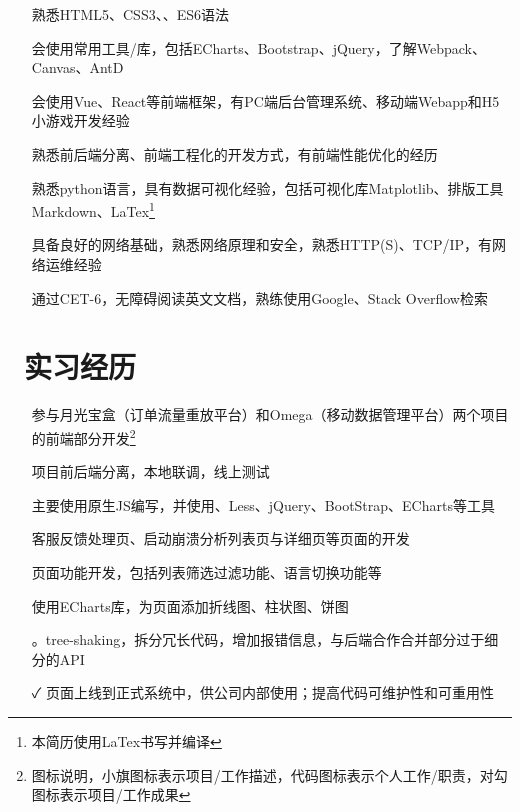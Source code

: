 \documentclass[14pt]{resume}
\begin{document}
\begin{itemize}
    \item[\faTree] 熟悉HTML5、CSS3、\textbf{\color{red}{原生JavaScript}}、ES6语法
    \item[\faTree] 会使用常用工具/库，包括ECharts、Bootstrap、jQuery，了解Webpack、Canvas、AntD
    \item[\faTree] 会使用Vue、React等前端框架，有PC端后台管理系统、移动端Webapp和H5小游戏开发经验
    \item[\faTree] 熟悉前后端分离、前端工程化的开发方式，有前端性能优化的经历
    \item[\faTree] 熟悉python语言，具有数据可视化经验，包括可视化库Matplotlib、排版工具Markdown、LaTex\footnote{本简历使用LaTex书写并编译}
    \item[\faTree] 具备良好的网络基础，熟悉网络原理和安全，熟悉HTTP(S)、TCP/IP，有网络运维经验
    \item[\faTree] 通过CET-6，无障碍阅读英文文档，熟练使用Google、Stack Overflow检索
\end{itemize}

\section{\faBriefcase\ 实习经历}
\begin{itemize}
    \item[\faFlagO] 参与月光宝盒（订单流量重放平台）和Omega（移动数据管理平台）两个项目的前端部分开发\footnote{图标说明，小旗图标表示项目/工作描述，代码图标表示个人工作/职责，对勾图标表示项目/工作成果}
    \item[\faFlagO] 项目前后端分离，本地联调，线上测试
    \item[\faFlagO] 主要使用原生JS编写，并使用\textbf{\color{red}{模板引擎Simplite}}、Less、jQuery、BootStrap、ECharts等工具
    \item[\faCode] 客服反馈处理页、启动崩溃分析列表页与详细页等页面的开发
    \item[\faCode] 页面功能开发，包括列表筛选过滤功能、语言切换功能等
    \item[\faCode] 使用ECharts库，为页面添加折线图、柱状图、饼图
    \item[\faCode] \textbf{\color{red}{代码重构}}。tree-shaking，拆分冗长代码，增加报错信息，与后端合作合并部分过于细分的API
    \item[\faCheck] 页面上线到正式系统中，供公司内部使用；提高代码可维护性和可重用性
\end{itemize}
\end{document}
